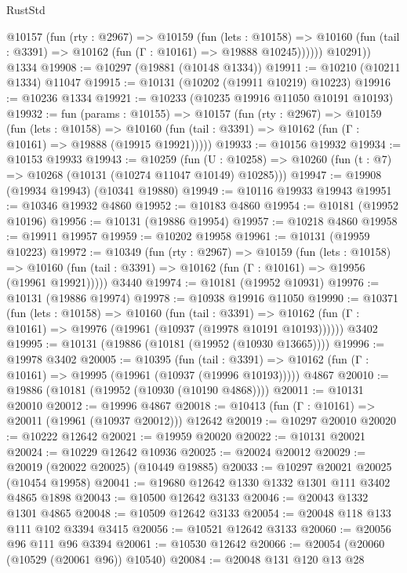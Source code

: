 \begin{lexlean}{RustStd}
\begin{coremodule}
          @10157
            (fun (rty : @2967) =>
            @10159
              (fun (lets : @10158) =>
              @10160 (fun (tail : @3391) => @10162 (fun (Γ : @10161) => @19888 @10245))))))
        @10291))
    @1334
@19908 := @10297 (@19881 (@10148 @1334))
@19911 := @10210 (@10211 @1334) @11047
@19915 := @10131 (@10202 (@19911 @10219) @10223)
@19916 := @10236 @1334
@19921 := @10233 (@10235 @19916 @11050 @10191 @10193)
@19932 := fun (params : @10155) =>
  @10157
    (fun (rty : @2967) =>
    @10159
      (fun (lets : @10158) =>
      @10160 (fun (tail : @3391) => @10162 (fun (Γ : @10161) => @19888 (@19915 @19921)))))
@19933 := @10156 @19932
@19934 := @10153 @19933
@19943 := @10259
    (fun (U : @10258) => @10260 (fun (t : @7) => @10268 (@10131 (@10274 @11047 @10149) @10285)))
@19947 := @19908 (@19934 @19943) (@10341 @19880)
@19949 := @10116 @19933 @19943
@19951 := @10346 @19932 @4860
@19952 := @10183 @4860
@19954 := @10181 (@19952 @10196)
@19956 := @10131 (@19886 @19954)
@19957 := @10218 @4860
@19958 := @19911 @19957
@19959 := @10202 @19958
@19961 := @10131 (@19959 @10223)
@19972 := @10349
    (fun (rty : @2967) =>
    @10159
      (fun (lets : @10158) =>
      @10160 (fun (tail : @3391) => @10162 (fun (Γ : @10161) => @19956 (@19961 @19921)))))
    @3440
@19974 := @10181 (@19952 @10931)
@19976 := @10131 (@19886 @19974)
@19978 := @10938 @19916 @11050
@19990 := @10371
    (fun (lets : @10158) =>
    @10160
      (fun (tail : @3391) =>
      @10162 (fun (Γ : @10161) => @19976 (@19961 (@10937 (@19978 @10191 @10193))))))
    @3402
@19995 := @10131 (@19886 (@10181 (@19952 (@10930 @13665))))
@19996 := @19978 @3402
@20005 := @10395
    (fun (tail : @3391) => @10162 (fun (Γ : @10161) => @19995 (@19961 (@10937 (@19996 @10193)))))
    @4867
@20010 := @19886 (@10181 (@19952 (@10930 (@10190 @4868))))
@20011 := @10131 @20010
@20012 := @19996 @4867
@20018 := @10413 (fun (Γ : @10161) => @20011 (@19961 (@10937 @20012))) @12642
@20019 := @10297 @20010
@20020 := @10222 @12642
@20021 := @19959 @20020
@20022 := @10131 @20021
@20024 := @10229 @12642 @10936
@20025 := @20024 @20012
@20029 := @20019 (@20022 @20025) (@10449 @19885)
@20033 := @10297 @20021 @20025 (@10454 @19958)
@20041 := @19680 @12642 @1330 @1332 @1301 @111 @3402 @4865 @1898
@20043 := @10500 @12642 @3133
@20046 := @20043 @1332 @1301 @4865
@20048 := @10509 @12642 @3133
@20054 := @20048 @118 @133 @111 @102 @3394 @3415
@20056 := @10521 @12642 @3133
@20060 := @20056 @96 @111 @96 @3394
@20061 := @10530 @12642
@20066 := @20054 (@20060 (@10529 (@20061 @96)) @10540)
@20084 := @20048
    @131
    @120
    @13
    @28

\end{coremodule}
\end{lexlean}
